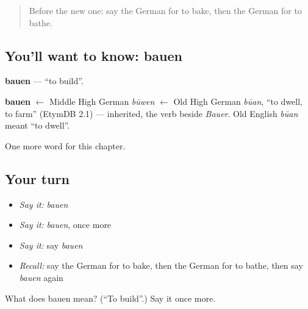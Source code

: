 \label{lesson:GE-C175-bauen}



\begin{quote}
Before the new one: say the German for to bake, then the German for to bathe.
\end{quote}

\subsection*{You'll want to know: bauen}
\textbf{bauen} — \textquotedblleft{}to build\textquotedblright{}.

\begin{cousinweb}
\textbf{bauen} $\leftarrow$ Middle High German \emph{būwen} $\leftarrow$ Old High German \emph{būan}, \textquotedblleft{}to dwell, to farm\textquotedblright{} (EtymDB 2.1) — inherited, the verb beside \emph{Bauer}. Old English \emph{būan} meant \textquotedblleft{}to dwell\textquotedblright{}.
\end{cousinweb}

\begin{grammarlens}[title={What you've built}]
One more word for this chapter.
\end{grammarlens}

\subsection*{Your turn}
\begin{itemize}
\raggedright
  \item \emph{Say it:} \emph{bauen}
  \item \emph{Say it:} \emph{bauen}, once more
  \item \emph{Say it:} say \emph{bauen}
  \item \emph{Recall:} say the German for to bake, then the German for to bathe, then say \emph{bauen} again
\end{itemize}

\begin{tcolorbox}[breakable,colback=teal!4,colframe=teal!35!black,title={Before you move on}]
What does bauen mean? (\textquotedblleft{}To build\textquotedblright{}.) Say it once more.
\end{tcolorbox}
